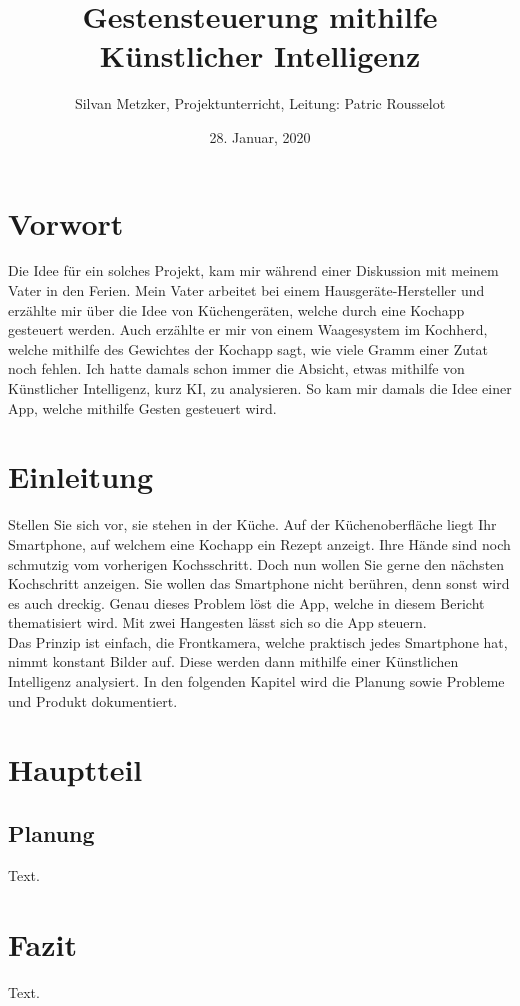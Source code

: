 \documentclass[12pt]{article}
\begin{document}
\title{Gestensteuerung mithilfe Künstlicher Intelligenz}
\date{28. Januar, 2020}
\author{Silvan Metzker, Projektunterricht, Leitung: Patric Rousselot}
\maketitle
\newpage

\renewcommand\contentsname{Inhaltsverzeichnis}
\tableofcontents
\newpage

\section{Vorwort}
Die Idee für ein solches Projekt, kam mir während einer Diskussion mit meinem Vater in den Ferien. Mein Vater arbeitet bei einem Hausgeräte-Hersteller und erzählte mir über die Idee von Küchengeräten, welche durch eine Kochapp gesteuert werden. Auch erzählte er mir von einem Waagesystem im Kochherd, welche mithilfe des Gewichtes der Kochapp sagt, wie viele Gramm einer Zutat noch fehlen. Ich hatte damals schon immer die Absicht, etwas mithilfe von Künstlicher Intelligenz, kurz KI, zu analysieren. So kam mir damals die Idee einer App, welche mithilfe Gesten gesteuert wird.

\section{Einleitung}
Stellen Sie sich vor, sie stehen in der Küche. Auf der Küchenoberfläche liegt Ihr Smartphone, auf welchem eine Kochapp ein Rezept anzeigt. Ihre Hände sind noch schmutzig vom vorherigen Kochsschritt. Doch nun wollen Sie gerne den nächsten Kochschritt anzeigen. Sie wollen das Smartphone nicht berühren, denn sonst wird es auch dreckig. Genau dieses Problem löst die App, welche in diesem Bericht thematisiert wird. Mit zwei Hangesten lässt sich so die App steuern.\\ Das Prinzip ist einfach, die Frontkamera, welche praktisch jedes Smartphone hat, nimmt konstant Bilder auf. Diese werden dann mithilfe einer Künstlichen Intelligenz analysiert. In den folgenden Kapitel wird die Planung sowie Probleme und Produkt dokumentiert.


\section{Hauptteil}
\subsection{Planung}
Text.

\section{Fazit}
Text.


\renewcommand\refname{Biliografie}

\end{document}
